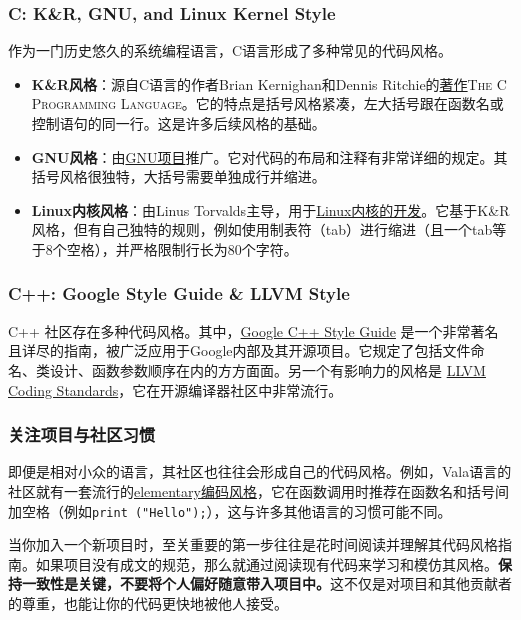 \documentclass[../main.tex]{subfiles}
\begin{document}
\subsubsection{C: K\&R, GNU, and Linux Kernel Style}
作为一门历史悠久的系统编程语言，C语言形成了多种常见的代码风格。
\begin{itemize}
  \item \textbf{K\&R风格}：源自C语言的作者Brian Kernighan和Dennis Ritchie的\href{https://en.wikipedia.org/wiki/The_C_Programming_Language}{著作}\textsc{The C Programming Language}。它的特点是括号风格紧凑，左大括号跟在函数名或控制语句的同一行。这是许多后续风格的基础。
  \item \textbf{GNU风格}：由\href{https://www.gnu.org/prep/standards/standards.html}{GNU项目}推广。它对代码的布局和注释有非常详细的规定。其括号风格很独特，大括号需要单独成行并缩进。
  \item \textbf{Linux内核风格}：由Linus Torvalds主导，用于\href{https://www.kernel.org/doc/html/latest/process/coding-style.html}{Linux内核的开发}。它基于K\&R风格，但有自己独特的规则，例如使用制表符（tab）进行缩进（且一个tab等于8个空格），并严格限制行长为80个字符。
\end{itemize}

\subsubsection{C++: Google Style Guide \& LLVM Style}
C++ 社区存在多种代码风格。其中，\href{https://google.github.io/styleguide/cppguide.html}{Google C++ Style Guide} 是一个非常著名且详尽的指南，被广泛应用于Google内部及其开源项目。它规定了包括文件命名、类设计、函数参数顺序在内的方方面面。另一个有影响力的风格是 \href{https://llvm.org/docs/CodingStandards.html}{LLVM Coding Standards}，它在开源编译器社区中非常流行。

\subsubsection{关注项目与社区习惯}
即便是相对小众的语言，其社区也往往会形成自己的代码风格。例如，Vala语言的社区就有一套流行的\href{https://docs.elementary.io/develop/writing-apps/code-style}{elementary编码风格}，它在函数调用时推荐在函数名和括号间加空格（例如\texttt{print ("Hello");}），这与许多其他语言的习惯可能不同。

当你加入一个新项目时，至关重要的第一步往往是花时间阅读并理解其代码风格指南。如果项目没有成文的规范，那么就通过阅读现有代码来学习和模仿其风格。\textbf{保持一致性是关键，不要将个人偏好随意带入项目中。}这不仅是对项目和其他贡献者的尊重，也能让你的代码更快地被他人接受。
\end{document}
